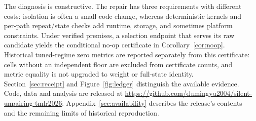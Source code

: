 The diagnosis is constructive. The repair has three requirements with
different costs: isolation is often a small code change, whereas deterministic
kernels and per-path repeat/state checks add runtime, storage, and sometimes
platform constraints. Under verified premises, a selection endpoint that
serves its raw candidate yields the conditional no-op certificate in
Corollary~\ref{cor:noop}. Historical tuned-regime zero metrics are reported
separately from this certificate: cells without an independent floor are
excluded from certificate counts, and metric equality is not upgraded to
weight or full-state identity. Section~\ref{sec:receipt} and
Figure~\ref{fig:ledger} distinguish the available evidence.
Code, data and analysis are released at
\url{https://github.com/dumingyu2004/silent-unpairing-tmlr2026};
Appendix~\ref{sec:availability} describes the release's contents
and the remaining limits of historical reproduction.
